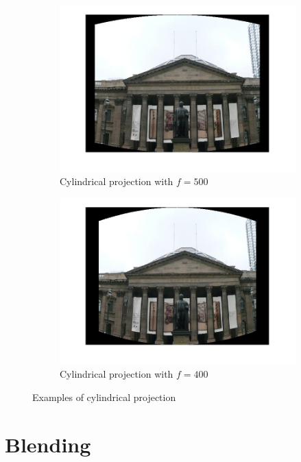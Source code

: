 \documentclass[12pt]{article}
\begin{document}
\begin{figure}[t!]
    \begin{subfigure}[t]{0.5\textwidth}
        \centering
        \includegraphics[width=\linewidth]{img/cylinder3}
        \caption{Cylindrical projection with $f = 500$}
        \label{fig_cyl_proj1}
    \end{subfigure}
    \begin{subfigure}[t]{0.5\textwidth}
        \centering
        \includegraphics[width=\linewidth]{img/cylinder4}
        \caption{Cylindrical projection with $f = 400$}
        \label{fig_cyl_proj2}
    \end{subfigure}
    \caption{Examples of cylindrical projection}
    \label{fig_cyl_proj}
\end{figure}


\section{Blending}
\end{document}
